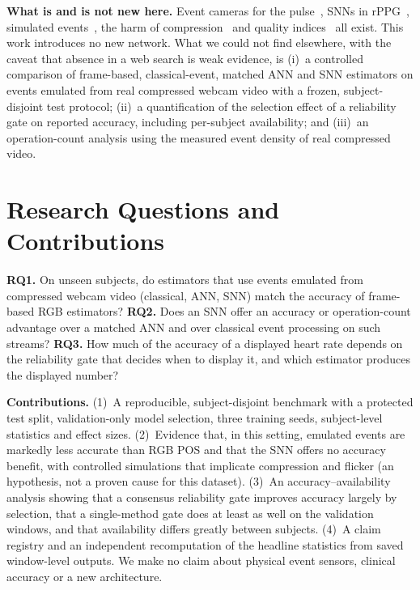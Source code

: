 \documentclass[10pt,journal]{IEEEtran}
\begin{document}
\textbf{What is and is not new here.} Event cameras for the pulse~\cite{jagtap2023hr,moustafa2025event,feng2026empd,feng2026fusion}, SNNs in rPPG~\cite{liu2025spikingphysformer}, simulated events~\cite{hu2021v2e,gehrig2020video2events}, the harm of compression~\cite{mcduff2017compression,rapczynski2019} and quality indices~\cite{elgendi2024sqi} all exist. This work introduces no new network. What we could not find elsewhere, with the caveat that absence in a web search is weak evidence, is (i)~a controlled comparison of frame-based, classical-event, matched ANN and SNN estimators on events emulated from real compressed webcam video with a frozen, subject-disjoint test protocol; (ii)~a quantification of the selection effect of a reliability gate on reported accuracy, including per-subject availability; and (iii)~an operation-count analysis using the measured event density of real compressed video.

\section{Research Questions and Contributions}
\textbf{RQ1.} On unseen subjects, do estimators that use events emulated from compressed webcam video (classical, ANN, SNN) match the accuracy of frame-based RGB estimators?
\textbf{RQ2.} Does an SNN offer an accuracy or operation-count advantage over a matched ANN and over classical event processing on such streams?
\textbf{RQ3.} How much of the accuracy of a displayed heart rate depends on the reliability gate that decides when to display it, and which estimator produces the displayed number?

\textbf{Contributions.} (1)~A reproducible, subject-disjoint benchmark with a protected test split, validation-only model selection, three training seeds, subject-level statistics and effect sizes. (2)~Evidence that, in this setting, emulated events are markedly less accurate than RGB POS and that the SNN offers no accuracy benefit, with controlled simulations that implicate compression and flicker (an hypothesis, not a proven cause for this dataset). (3)~An accuracy--availability analysis showing that a consensus reliability gate improves accuracy largely by selection, that a single-method gate does at least as well on the validation windows, and that availability differs greatly between subjects. (4)~A claim registry and an independent recomputation of the headline statistics from saved window-level outputs. We make no claim about physical event sensors, clinical accuracy or a new architecture.
\end{document}
